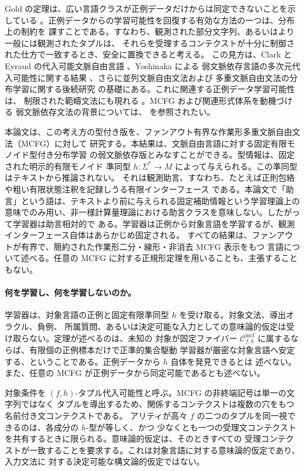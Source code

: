 \documentclass[11pt,a4paper]{ltjsarticle}
\theoremstyle{remark}
\newcommand{\Cmcf}[2]{\mathcal{C}^{\mathrm{mcf}}_{#1,#2}}
\begin{document}
Gold の定理は、広い言語クラスが正例データだけからは同定できないことを示している
\cite{Gold1967}。正例データからの学習可能性を回復する有効な方法の一つは、分布上の制約を
課すことである。すなわち、観測された部分文字列、あるいはより一般には観測されたタプルは、
それらを受理するコンテクストが十分に制御された仕方で一致するとき、安全に置換できると考える。
この見方は、Clark と Eyraud の代入可能文脈自由言語 \cite{ClarkEyraud2007}、Yoshinaka による
弱文脈依存言語の多次元代入可能性に関する結果
\cite{Yoshinaka2008,Yoshinaka2009,Yoshinaka2011}、さらに並列文脈自由文法および
多重文脈自由文法の分布学習に関する後続研究
\cite{ClarkYoshinaka2014,ClarkYoshinaka2016} の基礎にある。これに関連する正例データ学習可能性は、
制限された範疇文法にも現れる \cite{Kanazawa1998}。MCFG および関連形式体系を動機づける
弱文脈依存文法の背景については、
\cite{Shieber1985,VijayShankerWeirJoshi1987,Weir1988,Kallmeyer2010} を参照されたい。

本論文は、この考え方の型付き版を、ファンアウト有界な作業形多重文脈自由文法（MCFG）に対して
研究する。本結果は、文脈自由言語に対する固定有限モノイド型付き分布学習
\cite{kuriyamaCFG} の弱文脈依存版とみなすことができる。型情報は、固定された明示的有限モノイド
準同型 \(h:\Sigma^*\to M\) によって与えられる。この準同型はテキストから推論されない。
それは観測助言、すなわち、たとえば正則包絡や粗い有限状態注釈を記録しうる有限インターフェース
である。本論文で「助言」という語は、テキストより前に与えられる固定補助情報という学習理論上の
意味でのみ用い、非一様計算量理論における助言クラスを意味しない。したがって学習器は助言相対的で
ある。学習器は正例から対象言語を学習するが、観測インターフェース自体はあらかじめ固定される。
すべての結果は、ファンアウトが有界で、簡約された作業形二分・線形・非消去 MCFG 表示をもつ
言語について述べる。任意の MCFG に対する正規形定理を用いることも、主張することもない。

\paragraph{何を学習し、何を学習しないのか。}
学習器は、対象言語の正例と固定有限準同型 \(h\) を受け取る。対象文法、導出オラクル、負例、
所属質問、あるいは決定可能な入力としての意味論的仮定は受け取らない。定理が述べるのは、未知の
対象が固定ファイバー \(\Cmcf{f}{h}\) に属するならば、有限個の正例標本だけで正準的集合駆動
学習器が厳密な対象言語へ安定する、ということである。正例データから \(h\) 自体を発見できるとは
述べない。また、任意の MCFG が正例データから同定可能であるとも述べない。

対象条件を \((f,h)\)-タプル代入可能性と呼ぶ。MCFG の非終端記号は単一の文字列ではなく
タプルを導出するため、関係するコンテクストは複数の穴をもつ名前付き文コンテクストである。
アリティが高々 \(f\) の二つのタプルを同一視できるのは、各成分の \(h\)-型が等しく、かつ
少なくとも一つの受理文コンテクストを共有するときに限られる。意味論的仮定は、そのときすべての
受理コンテクストが一致することを要求する。これは対象言語に対する意味論的仮定であり、入力文法に
対する決定可能な構文論的仮定ではない。
\end{document}
